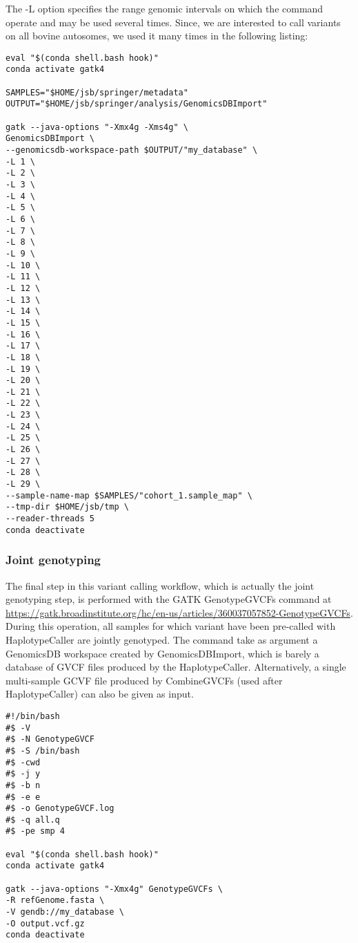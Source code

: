The -L option specifies the range genomic intervals on which the command operate and may be used several times. Since, we are interested to call variants on all bovine autosomes, we used it many times in the following listing:


\begin{verbatim}
eval "$(conda shell.bash hook)"
conda activate gatk4

SAMPLES="$HOME/jsb/springer/metadata"
OUTPUT="$HOME/jsb/springer/analysis/GenomicsDBImport"

gatk --java-options "-Xmx4g -Xms4g" \
GenomicsDBImport \
--genomicsdb-workspace-path $OUTPUT/"my_database" \
-L 1 \
-L 2 \
-L 3 \
-L 4 \
-L 5 \
-L 6 \
-L 7 \
-L 8 \
-L 9 \
-L 10 \
-L 11 \
-L 12 \
-L 13 \
-L 14 \
-L 15 \
-L 16 \
-L 17 \
-L 18 \
-L 19 \
-L 20 \
-L 21 \
-L 22 \
-L 23 \
-L 24 \
-L 25 \
-L 26 \
-L 27 \
-L 28 \
-L 29 \
--sample-name-map $SAMPLES/"cohort_1.sample_map" \
--tmp-dir $HOME/jsb/tmp \
--reader-threads 5
conda deactivate

\end{verbatim}


\subsubsection{Joint genotyping}

The final step in this variant calling workflow, which is actually the joint genotyping step, is performed with the GATK GenotypeGVCFs command at  \href{https://gatk.broadinstitute.org/hc/en-us/articles/360037057852-GenotypeGVCFs}{https://gatk.broadinstitute.org/hc/en-us/articles/360037057852-GenotypeGVCFs}. During this operation, all samples for which variant have been pre-called with HaplotypeCaller are jointly genotyped. The command take as argument a GenomicsDB workspace created by GenomicsDBImport, which is barely a database of GVCF files produced by the HaplotypeCaller. Alternatively, a single multi-sample GCVF file produced by CombineGVCFs (used after HaplotypeCaller) can also be given as input.

\begin{verbatim}
#!/bin/bash
#$ -V
#$ -N GenotypeGVCF
#$ -S /bin/bash
#$ -cwd
#$ -j y
#$ -b n
#$ -e e
#$ -o GenotypeGVCF.log
#$ -q all.q
#$ -pe smp 4

eval "$(conda shell.bash hook)"
conda activate gatk4

gatk --java-options "-Xmx4g" GenotypeGVCFs \
-R refGenome.fasta \
-V gendb://my_database \
-O output.vcf.gz
conda deactivate
\end{verbatim}






